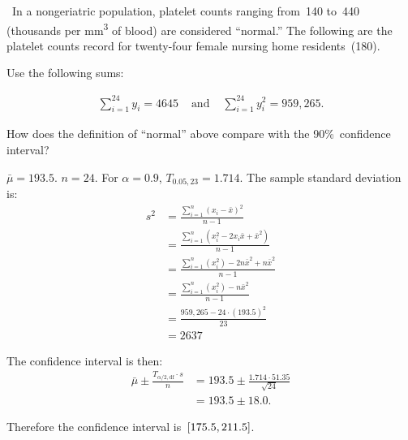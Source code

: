 \begin{problem}
  ~In a nongeriatric population, platelet counts ranging from~140 to~440 (thousands per mm\textsuperscript{3} of blood) are considered ``normal.'' The following are the platelet counts record for twenty-four female nursing home residents~(180).

  Use the following sums:

  \begin{align}
    \sum_{i=1}^{24} y_i = 4645 &\text{ and }  &\sum_{i=1}^{24} y_i^{2} = 959,265 \text{.}
  \end{align}

  How does the definition of ``normal'' above compare with the 90\%~confidence interval?
\end{problem}

${\bar{\mu} = 193.5}$. ${n = 24}$.  For ${\alpha = 0.9}$, ${T_{0.05,23} = 1.714}$. The sample standard deviation is:
\begin{align}
  s^{2} &= \frac{\sum_{i=1}^{n} \left(x_i - \bar{x}\right)^2}{n-1} \\
        &= \frac{\sum_{i=1}^{n} \left(x^2_{i} - 2x_i \bar{x} + \bar{x}^2\right)}{n-1} \\
        &= \frac{\sum_{i=1}^{n} \left(x^2_{i}\right) - 2n\bar{x}^2 + n\bar{x}^2}{n-1} \\
        &= \frac{\sum_{i=1}^{n} \left(x^2_{i}\right) - n\bar{x}^2}{n-1} \\
        &= \frac{959,265 - 24 \cdot \left(193.5\right)^2}{23} \\
        &= 2637
\end{align}

The confidence interval is then:
\begin{align}
  \bar{\mu} \pm \frac{T_{\alpha / 2, \text{df}} \cdot s}{n} &= 193.5 \pm \frac{1.714 \cdot 51.35}{\sqrt{24}} \\
                                                            &= 193.5 \pm 18.0 \text{.}
\end{align}

Therefore the confidence interval is~$\lbrack175.5,211.5\rbrack$.
